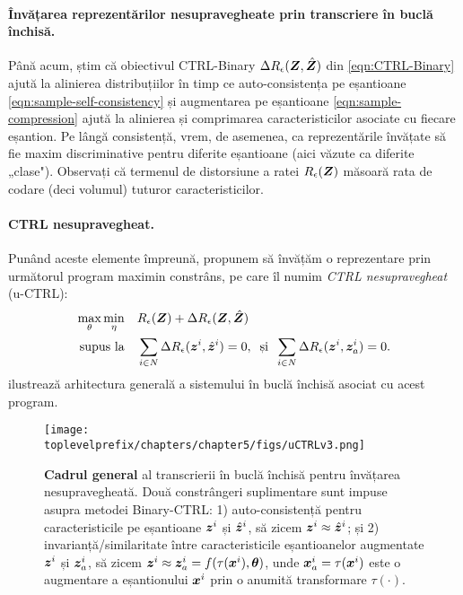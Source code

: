\documentclass[../../book-main_ro.tex]{subfiles}
\begin{document}
\paragraph{Învățarea reprezentărilor nesupravegheate prin transcriere în buclă închisă.}
Până acum, știm că obiectivul CTRL-Binary $\Delta R_\epsilon(\bm{Z}, \hat{\bm{Z}})$ din \eqref{eqn:CTRL-Binary} ajută la alinierea distribuțiilor în timp ce auto-consistența pe eșantioane \eqref{eqn:sample-self-consistency} și augmentarea pe eșantioane \eqref{eqn:sample-compression} ajută la alinierea și comprimarea caracteristicilor asociate cu fiecare eșantion. Pe lângă consistență, vrem, de asemenea, ca reprezentările învățate să fie maxim discriminative pentru diferite eșantioane (aici văzute ca diferite „clase"). Observați că termenul de distorsiune a ratei $R_\epsilon(\bm{Z})$ măsoară rata de codare (deci volumul) tuturor caracteristicilor.

\paragraph{CTRL nesupravegheat.} Punând aceste elemente împreună, propunem să învățăm o reprezentare prin următorul program maximin constrâns, pe care îl numim {\em CTRL nesupravegheat} (u-CTRL):
\begin{align}
      \max_\theta \min_\eta  \quad & R_\epsilon(\bm{Z}) + \Delta R_\epsilon(\bm{Z}, \hat{\bm{Z}}) \label{eqn:constrained_maxmin}\\
 \mbox{supus la} \quad & \sum_{i\in N} \Delta R_\epsilon(\bm{z}^i, \hat{\bm{z}}^i) = 0, \;\; \mbox{și} \;\; \sum_{i\in N} \Delta R_\epsilon(\bm{z}^i, \bm{z}_{a}^i) = 0. \nonumber
\end{align}
 ilustrează arhitectura generală a sistemului în buclă închisă asociat cu acest program.
\begin{figure}[t]
\centering
\texttt{[image: \\toplevelprefix/chapters/chapter5/figs/uCTRLv3.png]}
\caption{\textbf{Cadrul general} al transcrierii în buclă închisă pentru învățarea nesupravegheată. Două constrângeri suplimentare sunt impuse asupra metodei Binary-CTRL: 1) auto-consistență pentru caracteristicile pe eșantioane $\bm{z}^i$ și $\hat{\bm{z}}^i$, să zicem $\bm{z}^i \approx \hat{\bm{z}}^i$; și 2) invarianță/similaritate între caracteristicile eșantioanelor augmentate $\bm{z}^i$ și $\bm{z}_{a}^i$, să zicem $\bm{z}^i \approx \bm{z}_{a}^i=f(\tau(\bm{x}^i), \bm \theta)$, unde $\bm{x}^i_a=\tau(\bm{x}^i)$ este o augmentare a eșantionului $\bm{x}^i$ prin o anumită transformare $\tau(\cdot)$.}
\label{fig:framework-uCTRL}
\end{figure}
\end{document}
